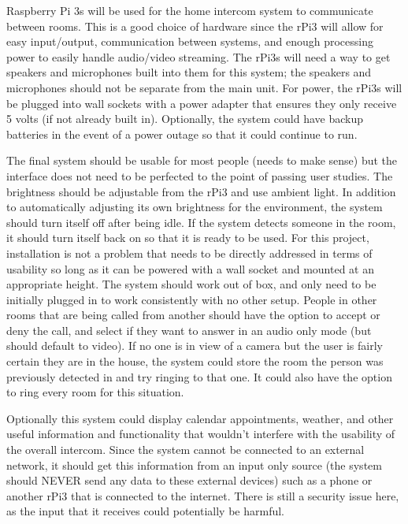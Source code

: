 \documentclass{article}
\begin{document}
Raspberry Pi 3s will be used for the home intercom system to communicate between rooms. This is a good choice of hardware since the rPi3 will allow for easy input/output, communication between systems, and enough processing power to easily handle audio/video streaming. The rPi3s will need a way to get speakers and microphones built into them for this system; the speakers and microphones should not be separate from the main unit. For power, the rPi3s will be plugged into wall sockets with a power adapter that ensures they only receive 5 volts (if not already built in). Optionally, the system could have backup batteries in the event of a power outage so that it could continue to run. 

The final system should be usable for most people (needs to make sense) but the interface does not need to be perfected to the point of passing user studies. The brightness should be adjustable from the rPi3 and use ambient light. In addition to automatically adjusting its own brightness for the environment, the system should turn itself off after being idle. If the system detects someone in the room, it should turn itself back on so that it is ready to be used. For this project, installation is not a problem that needs to be directly addressed in terms of usability so long as it can be powered with a wall socket and mounted at an appropriate height. The system should work out of box, and only need to be initially plugged in to work consistently with no other setup. People in other rooms that are being called from another should have the option to accept or deny the call, and select if they want to answer in an audio only mode (but should default to video). If no one is in view of a camera but the user is fairly certain they are in the house, the system could store the room the person was previously detected in and try ringing to that one. It could also have the option to ring every room for this situation. 

Optionally this system could display calendar appointments, weather, and other useful information and functionality that wouldn’t interfere with the usability of the overall intercom. Since the system cannot be connected to an external network, it should get this information from an input only source (the system should NEVER send any data to these external devices) such as a phone or another rPi3 that is connected to the internet. There is still a security issue here, as the input that it receives could potentially be harmful. 
\end{document}
